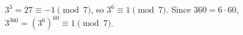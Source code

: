 $3^3=27\equiv-1\pmod7$, so $3^6\equiv1\pmod 7$. Since $360=6\cdot60$, $3^{360}=(3^6)^{60}\equiv\boxed{1}\pmod7$.
